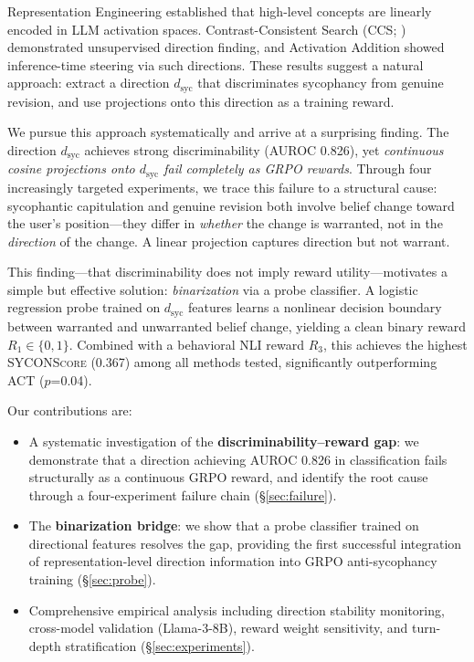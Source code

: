 \documentclass[11pt,a4paper]{article}
\newcommand{\dsyc}{d_{\text{syc}}}
\newcommand{\sycon}{\textsc{SYCONScore}}
\begin{document}
Representation Engineering \cite{zou2023representation} established that high-level concepts are linearly encoded in LLM activation spaces. Contrast-Consistent Search (CCS; \citealt{burns2023discovering}) demonstrated unsupervised direction finding, and Activation Addition \cite{turner2023activation} showed inference-time steering via such directions. These results suggest a natural approach: extract a direction $\dsyc$ that discriminates sycophancy from genuine revision, and use projections onto this direction as a training reward.

We pursue this approach systematically and arrive at a surprising finding. The direction $\dsyc$ achieves strong discriminability (AUROC 0.826), yet \emph{continuous cosine projections onto $\dsyc$ fail completely as GRPO rewards}. Through four increasingly targeted experiments, we trace this failure to a structural cause: sycophantic capitulation and genuine revision both involve belief change toward the user's position---they differ in \emph{whether} the change is warranted, not in the \emph{direction} of the change. A linear projection captures direction but not warrant.

This finding---that discriminability does not imply reward utility---motivates a simple but effective solution: \emph{binarization} via a probe classifier. A logistic regression probe trained on $\dsyc$ features learns a nonlinear decision boundary between warranted and unwarranted belief change, yielding a clean binary reward $R_1 \in \{0, 1\}$. Combined with a behavioral NLI reward $R_3$, this achieves the highest \sycon{} (0.367) among all methods tested, significantly outperforming ACT ($p$=0.04).

Our contributions are:
\begin{itemize}
    \item A systematic investigation of the \textbf{discriminability--reward gap}: we demonstrate that a direction achieving AUROC 0.826 in classification fails structurally as a continuous GRPO reward, and identify the root cause through a four-experiment failure chain (\S\ref{sec:failure}).
    \item The \textbf{binarization bridge}: we show that a probe classifier trained on directional features resolves the gap, providing the first successful integration of representation-level direction information into GRPO anti-sycophancy training (\S\ref{sec:probe}).
    \item Comprehensive empirical analysis including direction stability monitoring, cross-model validation (Llama-3-8B), reward weight sensitivity, and turn-depth stratification (\S\ref{sec:experiments}).
\end{itemize}
\end{document}
